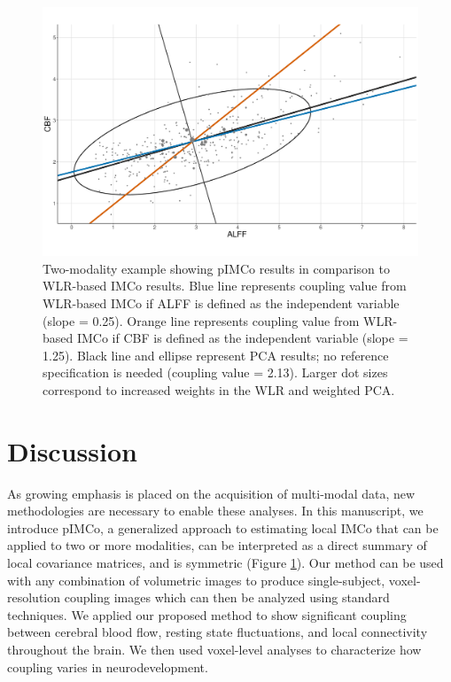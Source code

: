 \documentclass[
  12pt,
]{article}
\begin{document}
\begin{figure}
\includegraphics[width=62.83in]{figures/wlrpca} \caption{Two-modality example showing pIMCo results in comparison to WLR-based IMCo results. Blue line represents coupling value from WLR-based IMCo if ALFF is defined as the independent variable (slope = 0.25). Orange line represents coupling value from WLR-based IMCo if CBF is defined as the independent variable (slope = 1.25). Black line and ellipse represent PCA results; no reference specification is needed (coupling value = 2.13). Larger dot sizes correspond to increased weights in the WLR and weighted PCA.}\label{fig:wlrpca}
\end{figure}

\hypertarget{discussion}{%
\section{Discussion}\label{discussion}}

As growing emphasis is placed on the acquisition of multi-modal data, new methodologies are necessary to enable these analyses. In this manuscript, we introduce pIMCo, a generalized approach to estimating local IMCo that can be applied to two or more modalities, can be interpreted as a direct summary of local covariance matrices, and is symmetric (Figure \ref{fig:wlrpca}). Our method can be used with any combination of volumetric images to produce single-subject, voxel-resolution coupling images which can then be analyzed using standard techniques. We applied our proposed method to show significant coupling between cerebral blood flow, resting state fluctuations, and local connectivity throughout the brain. We then used voxel-level analyses to characterize how coupling varies in neurodevelopment.
\end{document}
